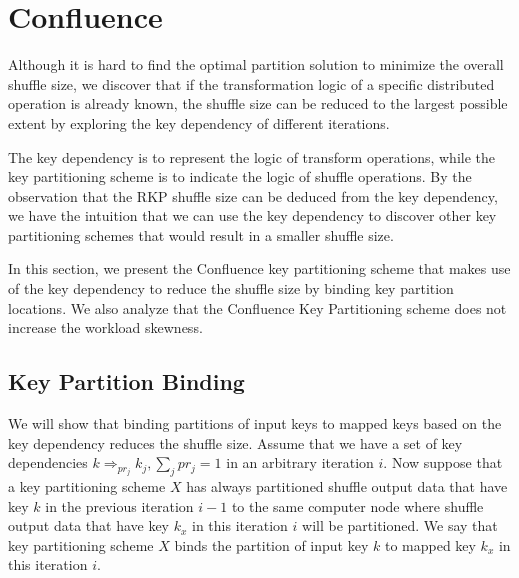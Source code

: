 \documentclass[10pt,journal,compsoc]{IEEEtran}
\begin{document}
\section{Confluence}\label{section:confluence}
Although it is hard to find the optimal partition solution to minimize the overall shuffle size,
we discover that 
if the transformation logic of a specific distributed operation is already known, 
the shuffle size can be reduced to the largest possible extent %
by exploring the key dependency of different iterations. 

The key dependency is to represent the logic of transform operations, 
while the key partitioning scheme is to indicate the logic of shuffle operations. 
By the observation that the RKP shuffle size can be deduced from the key
dependency, we have the intuition that we can use the key dependency to
discover other key partitioning schemes that would result in a smaller shuffle
size.

In this section, we present the Confluence key partitioning scheme
that makes use of the key dependency to reduce the shuffle size by binding 
key partition locations. 
We also analyze that the Confluence Key Partitioning scheme does not 
increase the workload skewness.


\subsection{Key Partition Binding}\label{section:binding}
We will show that binding partitions of input keys to mapped keys based on the key dependency reduces the shuffle size.
Assume that we have a set of key 
dependencies $k \Rightarrow_{pr_j} k_j, \sum_{j} pr_j = 1$ in an arbitrary iteration $i$. 
Now suppose that a key partitioning scheme $X$ has always partitioned
shuffle output data that have key $k$ in the previous iteration $i-1$ to the same computer node where 
shuffle output data that have key $k_x$ in this iteration $i$ will be partitioned. 
We say that key partitioning scheme $X$ binds the partition of 
input key $k$ to mapped key $k_x$ in this iteration $i$. 
\end{document}
